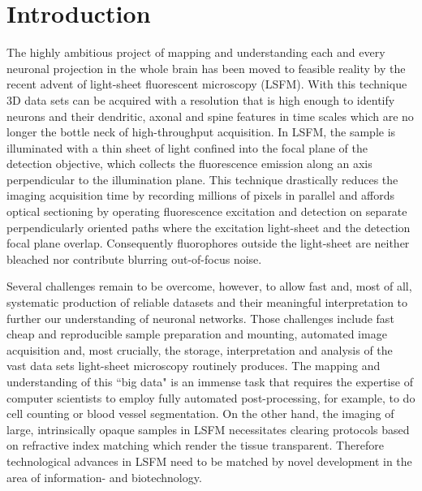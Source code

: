 \documentclass[12pt]{spieman}  %
\begin{document}
\section{Introduction}%
\label{sect:intro}  

The highly ambitious project of mapping and understanding each and every neuronal projection in the whole brain has been moved to feasible reality by the recent advent of light-sheet fluorescent microscopy (LSFM). With this technique 3D data sets can be acquired with a resolution that is high enough to identify neurons and their dendritic, axonal and spine features in time scales which are no longer the bottle neck of high-throughput acquisition. In LSFM, the sample is illuminated with a thin sheet of light confined into the focal plane of the detection objective, which collects the fluorescence emission along an axis perpendicular to the illumination plane\cite{Huisken2009}. This technique drastically reduces the imaging acquisition time by recording millions of pixels in parallel and affords optical sectioning by operating fluorescence excitation and detection on separate perpendicularly oriented paths where the excitation light-sheet and the detection focal plane overlap. Consequently fluorophores outside the light-sheet are neither bleached nor contribute blurring out-of-focus noise. 

Several challenges remain to be overcome, however, to allow fast and, most of all, systematic production of reliable datasets and their meaningful interpretation to further our understanding of neuronal networks. Those challenges include fast cheap and reproducible sample preparation and mounting, automated image acquisition and, most crucially, the storage, interpretation and analysis of the vast data sets light-sheet microscopy routinely produces. The mapping and understanding of this ``big data" is an immense task that requires the expertise of computer scientists to employ fully automated post-processing, for example, to do cell counting or blood vessel segmentation. On the other hand, the imaging of large, intrinsically opaque samples in LSFM necessitates clearing protocols based on refractive index matching which render the tissue transparent. Therefore technological advances in LSFM need to be matched by novel development in the area of information- and biotechnology.
\end{document}
